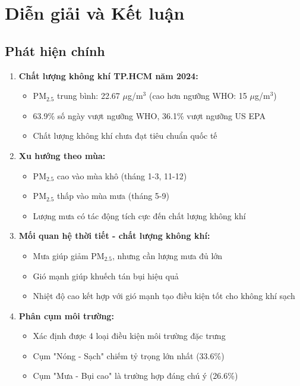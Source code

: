\documentclass[12pt,a4paper]{article}
\newcommand{\ugm}{$\mu$g/m$^3$}
\newcommand{\pmtwofive}{PM$_{2.5}$}
\begin{document}
\section{Diễn giải và Kết luận}

\subsection{Phát hiện chính}

\begin{enumerate}
    \item \textbf{Chất lượng không khí TP.HCM năm 2024:}
    \begin{itemize}
        \item \pmtwofive{} trung bình: 22.67 \ugm{} (cao hơn ngưỡng WHO: 15 \ugm{})
        \item 63.9\% số ngày vượt ngưỡng WHO, 36.1\% vượt ngưỡng US EPA
        \item Chất lượng không khí chưa đạt tiêu chuẩn quốc tế
    \end{itemize}
    
    \item \textbf{Xu hướng theo mùa:}
    \begin{itemize}
        \item \pmtwofive{} cao vào mùa khô (tháng 1-3, 11-12)
        \item \pmtwofive{} thấp vào mùa mưa (tháng 5-9)
        \item Lượng mưa có tác động tích cực đến chất lượng không khí
    \end{itemize}
    
    \item \textbf{Mối quan hệ thời tiết - chất lượng không khí:}
    \begin{itemize}
        \item Mưa giúp giảm \pmtwofive{}, nhưng cần lượng mưa đủ lớn
        \item Gió mạnh giúp khuếch tán bụi hiệu quả
        \item Nhiệt độ cao kết hợp với gió mạnh tạo điều kiện tốt cho không khí sạch
    \end{itemize}
    
    \item \textbf{Phân cụm môi trường:}
    \begin{itemize}
        \item Xác định được 4 loại điều kiện môi trường đặc trưng
        \item Cụm "Nóng - Sạch" chiếm tỷ trọng lớn nhất (33.6\%)
        \item Cụm "Mưa - Bụi cao" là trường hợp đáng chú ý (26.6\%)
    \end{itemize}
    

\end{enumerate}
\end{document}
